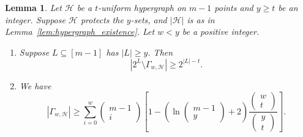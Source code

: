 \documentclass[10pt,a4paper]{amsart}
\newtheorem{lemma}{Lemma}
\begin{document}
\begin{lemma}\label{lem:protected_puncture_dist_and_dim}
    Let $\mathcal{H}$ be a $t$-uniform hypergraph on $m-1$ points and $y \geq t$ be an integer. Suppose $\mathcal{H}$ protects the $y$-sets, and $|\mathcal{H}|$ is as in Lemma~\ref{lem:hypergraph_existence}. Let $w < y$ be a positive integer.
    \begin{enumerate}
        \item Suppose $L \subseteq [m-1]$ has $|L| \geq y$. Then
        \begin{equation}
            \left|2^L \setminus \Gamma_{w,\mathcal{H}}\right| \geq 2^{|L|-t}.
        \end{equation}
        \item We have
        \begin{equation}
            \left|\Gamma_{w,\mathcal{H}}\right| \geq \sum_{i=0}^{w}\begin{pmatrix}
                m-1\\i
            \end{pmatrix}\left[1-\left(\ln\begin{pmatrix}m-1\\y\end{pmatrix}+2\right)\frac{\begin{pmatrix}w\\t\end{pmatrix}}{\begin{pmatrix}y\\t\end{pmatrix}}\right].
        \end{equation}
    \end{enumerate}
\end{lemma}
\end{document}
